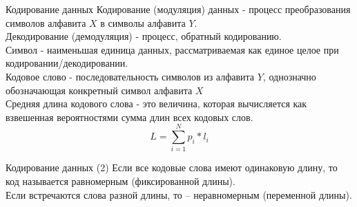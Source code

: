 \documentclass{beamer}
\begin{document}
\begin{frame}{Кодирование данных}
    \textcolor{custom_green}{Кодирование (модуляция) данных} - процесс преобразования символов алфавита \(X\) в символы алфавита \(Y\). \\
    \textcolor{custom_green}{Декодирование (демодуляция)} - процесс, обратный кодированию. \\
    \textcolor{custom_green}{Символ} - наименьшая единица данных, рассматриваемая как единое целое при кодировании/декодировании. \\
    \textcolor{custom_green}{Кодовое слово} - последовательность символов из алфавита \(Y\), однозначно обозначающая конкретный символ алфавита \(X\) \\
    \textcolor{custom_green}{Средняя длина кодового слова} - это величина, которая вычисляется как взвешенная вероятностями сумма длин всех кодовых слов. \\
    \[L=\sum_{i=1}^{N}p_i*l_i\]
\end{frame}

\begin{frame}{Кодирование данных (2)}
    Если все кодовые слова имеют одинаковую длину, то код называется \textcolor{custom_green}{равномерным} (фиксированной длины). \\
    Если встречаются слова разной длины, то – \textcolor{custom_green}{неравномерным} (переменной длины).
\end{frame}
\end{document}
